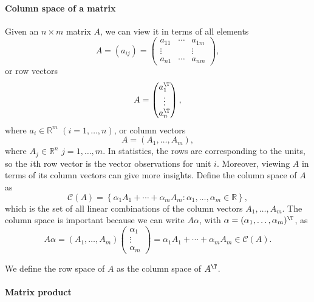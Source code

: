 \paragraph*{Column space of a matrix}




Given an $n\times m$ matrix $A$, we can view it in terms of all elements 
$$
A = (a_{ij})
= \begin{pmatrix}
a_{11} & \cdots & a_{1m} \\
\vdots &  & \vdots \\
a_{n1} & \cdots & a_{nm}
\end{pmatrix},
$$ 
or row vectors
$$
A = \begin{pmatrix}
a_1^{\T} \\
\vdots \\
a_n^{\T}
\end{pmatrix},
$$
where $a_i \in \mathbb{R}^m$ $(i=1, \ldots, n)$,  or column vectors
$$
A=(A_{1},\ldots,A_{m}),
$$
where $A_j \in \mathbb{R}^n$ $j=1,\ldots, m$. 
In statistics, the rows are corresponding to the units, so the $i$th row vector is the vector observations for unit $i$. Moreover, viewing $A$ in terms of its column vectors can give more insights. Define the  column space of $A$ as 
\[
\mathcal{C}(A)=\left\{ \alpha_{1}A_{1}+\cdots+\alpha_{m}A_{m}: \alpha_{1},\ldots,\alpha_{m}\in\mathbb{R}\right\} ,
\]
which is the set of all linear combinations of the column vectors  $A_{1},\ldots,A_{m}$.  The column space is important because  we can write $A\alpha$, with $\alpha = (\alpha_1, \ldots, \alpha_m)^{\T}$, as
$$
A\alpha = (A_{1},\ldots,A_{m}) \begin{pmatrix}
\alpha_1 \\
\vdots \\
\alpha_m
\end{pmatrix}
 = \alpha_{1}A_{1}+\cdots+\alpha_{m}A_{m}
 \in  \mathcal{C}(A).
$$

We define the row space of $A$ as the column space of $A^{\T}$. 



\paragraph{Matrix product}

